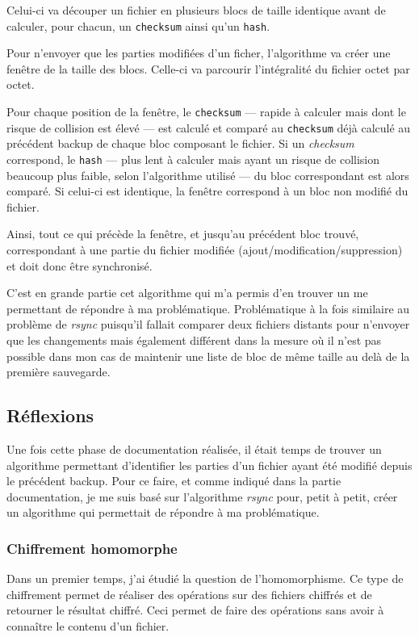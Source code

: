 \documentclass[a4paper,10pt, twoside]{report}
\begin{document}
\begin{spacing}{1.2}
Celui-ci va découper un fichier en plusieurs blocs de taille identique avant
de calculer, pour chacun, un \texttt{checksum} ainsi qu'un \texttt{hash}.

Pour n'envoyer que les parties modifiées d'un ficher, l'algorithme va créer
une fenêtre de la taille des blocs. Celle-ci va parcourir l'intégralité
du fichier octet par octet.

Pour chaque position de la fenêtre, le \texttt{checksum} --- rapide à
calculer mais dont le risque de collision est élevé --- est calculé et
comparé au \texttt{checksum} déjà calculé au précédent backup de
chaque bloc composant le fichier. Si un \textit{checksum} correspond, le
\texttt{hash} --- plus lent à calculer mais ayant un risque de collision
beaucoup plus faible, selon l'algorithme utilisé --- du bloc correspondant
est alors comparé. Si celui-ci est identique, la fenêtre correspond à un
bloc non modifié du fichier.

Ainsi, tout ce qui précède la fenêtre, et jusqu'au précédent bloc
trouvé, correspondant à une partie du fichier modifiée
(ajout/modification/suppression) et doit donc être synchronisé.

C'est en grande partie cet algorithme qui m'a permis d'en trouver un me
permettant de répondre à ma problématique. Problématique à la fois
similaire au problème de \textit{rsync} puisqu'il fallait comparer deux
fichiers distants pour n'envoyer que les changements mais également
différent dans la mesure où il n'est pas possible dans mon cas de maintenir
une liste de bloc de même taille au delà de la première sauvegarde.

\subsection{Réflexions}
Une fois cette phase de documentation réalisée, il était temps de trouver
un algorithme permettant d'identifier les parties d'un fichier ayant été
modifié depuis le précédent backup. Pour ce faire, et comme indiqué
dans la partie documentation, je me suis basé sur l'algorithme \textit{rsync}
pour, petit à petit, créer un algorithme qui permettait de répondre à ma
problématique.

\subsubsection{Chiffrement homomorphe}
Dans un premier temps, j'ai étudié la question de l'homomorphisme. Ce type
de chiffrement permet de réaliser des opérations sur des fichiers chiffrés
et de retourner le résultat chiffré. Ceci permet de faire des opérations
sans avoir à connaître le contenu d'un fichier.


\end{spacing}
\end{document}
